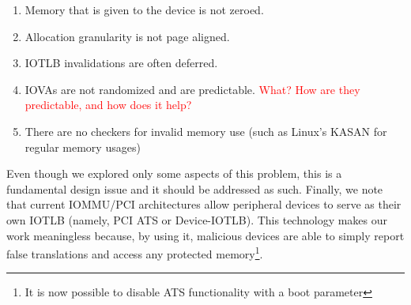 \begin{enumerate}
    \item Memory that is given to the device is not zeroed.
    \item Allocation granularity is not page aligned.
    \item IOTLB invalidations are often deferred.
    \item IOVAs are not randomized and are predictable. \textcolor{red}{What? How are they predictable, and how does it help?}
    \item There are no checkers for invalid memory use (such as Linux’s KASAN for regular memory usages)
\end{enumerate}
Even though we explored only some aspects of this problem, this is a fundamental design issue and it should be addressed as such. Finally, we note that current IOMMU/PCI architectures allow peripheral devices to serve as their own IOTLB (namely, PCI ATS or Device-IOTLB). This technology makes our work meaningless because, by using it, malicious devices are able to simply report false translations and access any protected memory\footnote{It is now possible to disable ATS functionality with a boot parameter}.

\begin{comment}
\footnote{\url{https://lore.kernel.org/lkml/20180510230948.GF190385@bhelgaas-glaptop.roam.corp.google.com/}}.
\end{comment}

